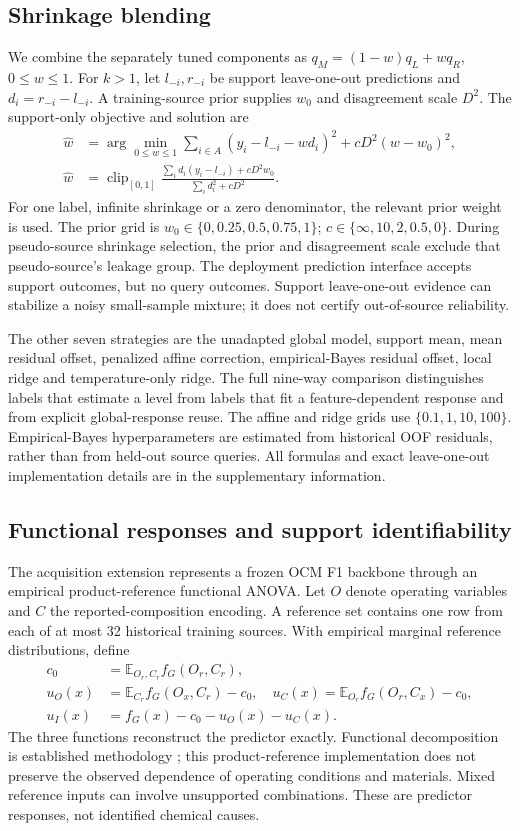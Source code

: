 \documentclass[11pt]{article}
\begin{document}
\subsection{Shrinkage blending}
We combine the separately tuned components as $q_M=(1-w)q_L+wq_R$, $0\leq w\leq1$. For $k>1$, let $l_{-i},r_{-i}$ be support leave-one-out predictions and $d_i=r_{-i}-l_{-i}$. A training-source prior supplies $w_0$ and disagreement scale $D^2$. The support-only objective and solution are
\begin{align}
\widehat w&=\arg\min_{0\leq w\leq1}\sum_{i\in A}(y_i-l_{-i}-wd_i)^2+cD^2(w-w_0)^2,\\
\widehat w&=\operatorname{clip}_{[0,1]}
\frac{\sum_i d_i(y_i-l_{-i})+cD^2w_0}{\sum_i d_i^2+cD^2}.
\end{align}
For one label, infinite shrinkage or a zero denominator, the relevant prior weight is used. The prior grid is $w_0\in\{0,0.25,0.5,0.75,1\}$; $c\in\{\infty,10,2,0.5,0\}$. During pseudo-source shrinkage selection, the prior and disagreement scale exclude that pseudo-source's leakage group. The deployment prediction interface accepts support outcomes, but no query outcomes. Support leave-one-out evidence can stabilize a noisy small-sample mixture; it does not certify out-of-source reliability.

The other seven strategies are the unadapted global model, support mean, mean residual offset, penalized affine correction, empirical-Bayes residual offset, local ridge and temperature-only ridge. The full nine-way comparison distinguishes labels that estimate a level from labels that fit a feature-dependent response and from explicit global-response reuse. The affine and ridge grids use $\{0.1,1,10,100\}$. Empirical-Bayes hyperparameters are estimated from historical OOF residuals, rather than from held-out source queries. All formulas and exact leave-one-out implementation details are in the supplementary information.


\subsection{Functional responses and support identifiability}
The acquisition extension represents a frozen OCM F1 backbone through an empirical product-reference functional ANOVA. Let $O$ denote operating variables and $C$ the reported-composition encoding. A reference set contains one row from each of at most 32 historical training sources. With empirical marginal reference distributions, define
\begin{align}
c_0&=\mathbb E_{O_r,C_r} f_G(O_r,C_r),\\
u_O(x)&=\mathbb E_{C_r}f_G(O_x,C_r)-c_0,\quad
u_C(x)=\mathbb E_{O_r}f_G(O_r,C_x)-c_0,\\
u_I(x)&=f_G(x)-c_0-u_O(x)-u_C(x).
\end{align}
The three functions reconstruct the predictor exactly. Functional decomposition is established methodology \cite{hooker}; this product-reference implementation does not preserve the observed dependence of operating conditions and materials. Mixed reference inputs can involve unsupported combinations. These are predictor responses, not identified chemical causes.
\end{document}
